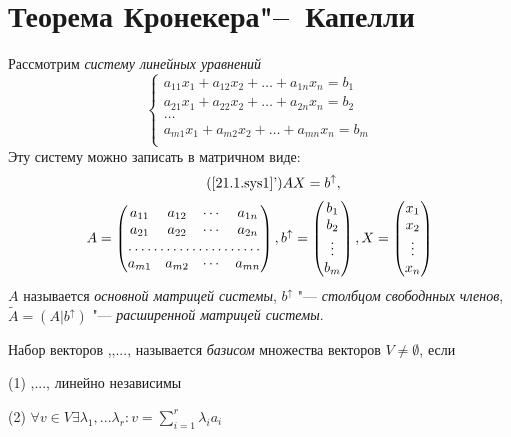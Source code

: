 \section{Теорема Кронекера"--~Капелли}
Рассмотрим \textit{систему линейных уравнений}
\begin{equation}\label{21.1.sys1}
\left\lbrace\begin{array}{crl}
a_{11}x_1+a_{12}x_2+\ldots+a_{1n}x_n=b_1\\
a_{21}x_1+a_{22}x_2+\ldots+a_{2n}x_n=b_2\\
\ldots \\
a_{m1}x_1+a_{m2}x_2+\ldots+a_{mn}x_n=b_m\\ 
\end{array}\right.\end{equation}
Эту систему можно записать в матричном виде:
\begin{equation*}\tag{\ref{21.1.sys1}'}
AX=b^{\uparrow},
\end{equation*}
\begin{equation*}
A=\begin{pmatrix}
a_{11} & a_{12} & \cdots & a_{1n} \\
a_{21} & a_{22} & \cdots & a_{2n} \\
\hdotsfor{4} \\
a_{m1} & a_{m2} & \cdots & a_{mn} \\
\end{pmatrix},
b^\uparrow=\begin{pmatrix}
b_1 \\ b_2 \\ \vdots \\ b_m \\
\end{pmatrix},
X=\begin{pmatrix}
x_1 \\ x_2 \\ \vdots \\ x_n \\
\end{pmatrix}
\end{equation*}
$A$ называется \textit{основной матрицей системы}, $b^\uparrow$ "--- \textit{столбцом свободнных членов}, $\widetilde A = (A|b^\uparrow)$ "--- \textit{расширенной матрицей системы}.
\begin{defn}
Набор векторов ,,..., называется \textit{базисом} множества векторов $V\neq \emptyset$, если

(1) ,..., линейно независимы

(2) $\forall v \in V \exists \lambda_1,...\lambda_r: v=\sum \limits_{i=1}^r\lambda_ia_i$
\end{defn}

